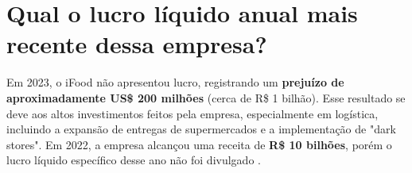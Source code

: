 \section{Qual o lucro líquido anual mais recente dessa empresa?}

Em 2023, o iFood não apresentou lucro, registrando um \textbf{prejuízo de aproximadamente US\$ 200 milhões} (cerca de R\$ 1 bilhão). Esse resultado se deve aos altos investimentos feitos pela empresa, especialmente em logística, incluindo a expansão de entregas de supermercados e a implementação de "dark stores". Em 2022, a empresa alcançou uma receita de \textbf{R\$ 10 bilhões}, porém o lucro líquido específico desse ano não foi divulgado \cite{tecmundo2023}.

